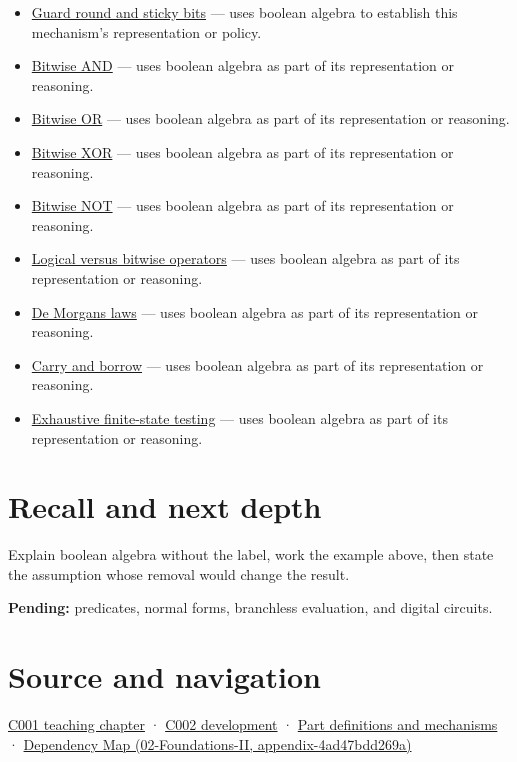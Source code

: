 \begin{itemize}
\item
  \hyperref[appendix-b572b631069b]{Guard round and sticky bits} --- uses boolean algebra to establish this mechanism's representation or policy.
\item
  \hyperref[appendix-68b52453737c]{Bitwise AND} --- uses boolean algebra as part of its representation or reasoning.
\item
  \hyperref[appendix-a427ce8ce8a6]{Bitwise OR} --- uses boolean algebra as part of its representation or reasoning.
\item
  \hyperref[appendix-d49161831368]{Bitwise XOR} --- uses boolean algebra as part of its representation or reasoning.
\item
  \hyperref[appendix-8f38927cfc54]{Bitwise NOT} --- uses boolean algebra as part of its representation or reasoning.
\item
  \hyperref[appendix-fe6b457d68d8]{Logical versus bitwise operators} --- uses boolean algebra as part of its representation or reasoning.
\item
  \hyperref[appendix-9079d3659da4]{De Morgan\textquotesingle s laws} --- uses boolean algebra as part of its representation or reasoning.
\item
  \hyperref[appendix-d52d5f78ffd1]{Carry and borrow} --- uses boolean algebra as part of its representation or reasoning.
\item
  \hyperref[appendix-05db24ccc28a]{Exhaustive finite-state testing} --- uses boolean algebra as part of its representation or reasoning.
\end{itemize}

\section{Recall and next depth}\label{appendix-24475e1596a8-recall-and-next-depth}

Explain boolean algebra without the label, work the example above, then state the assumption whose removal would change the result.

\textbf{Pending:} predicates, normal forms, branchless evaluation, and digital circuits.

\section{Source and navigation}\label{appendix-24475e1596a8-source-and-navigation}

\href{Continuous\%20Notes/Computing\%20Foundations\%20-\%20From\%20Bits\%20to\%20C++\%20and\%20Systems\%20APIs\#From\%20a\%20signal\%20to\%20an\%20interpretation}{C001 teaching chapter} · \href{Continuous\%20Notes/Computing\%20Foundations\%20-\%20From\%20Bits\%20to\%20C++\%20and\%20Systems\%20APIs\#Arithmetic\%20becomes\%20a\%20policy}{C002 development} · \hyperref[appendix-fd090d982a15]{Part definitions and mechanisms} · \href{../02-Foundations-II/main.pdf\#nameddest=appendix-4ad47bdd269a}{Dependency Map (02-Foundations-II, appendix-4ad47bdd269a)}
